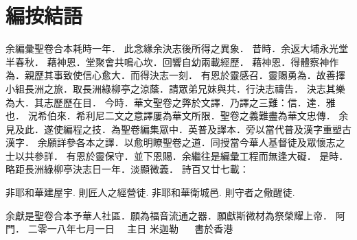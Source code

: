 \chapter*{編按結語}

余編彙聖卷合本耗時一年．
此念緣余決志後所得之異象．
\newline
\newline
昔時．余返大埔永光堂半春秋．
藉神恩．堂聚會共鳴心坎．回響自幼兩載經歷．
藉神恩．得體察神作為．親歷其事致使信心愈大．而得決志一刻．
有恩於靈感召．靈賜勇為．故善擇小組長洲之旅．取長洲綠柳亭之涼蔭．請眾弟兄妹與共．行決志禱告．
決志其樂為大．其志歷歷在目．
\newline
\newline
今時．華文聖卷之弊於文譯．乃譯之三難：信．達．雅也．
況希伯來．希利尼二文之意譯屢為華文所限．聖卷之義難盡為華文忠傳．
余見及此．遂使編程之技．為聖卷編集眾中．英普及譯本．旁以當代普及漢字重塑古漢字．
余願詳參各本之譯．以愈明瞭聖卷之道．同授當今華人基督徒及眾懷志之士以共參詳．
有恩於靈保守．並下恩賜．余繼往是編彙工程而無逢大礙．
\newline
\newline
是時．略距長洲綠柳亭決志日一年．淡顯微義．
\newline
\newline
詩百又廿七載：
\newline
\newline
\begin{center}
    非耶和華建屋宇. 則匠人之經營徒. 
\newline
    非耶和華衛城邑. 則守者之儆醒徒.
\newline
\newline
\end{center}
余獻是聖卷合本予華人社區．願為福音流通之器．願獻斯微材為祭榮耀上帝．
\newline
\newline
阿門．
\newline
\newline
二零一八年七月一日~~ 主日
\newline
\newline
米迦勒 ~~ 書於香港
